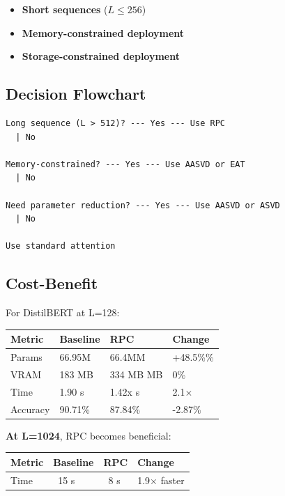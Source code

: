 \begin{itemize}
\item \textbf{Short sequences} ($L \leq 256$)
\item \textbf{Memory-constrained deployment}
\item \textbf{Storage-constrained deployment}

\end{itemize}
\subsection{Decision Flowchart}

\begin{lstlisting}
Long sequence (L > 512)? --- Yes --- Use RPC
  | No
   
Memory-constrained? --- Yes --- Use AASVD or EAT
  | No
   
Need parameter reduction? --- Yes --- Use AASVD or ASVD
  | No
   
Use standard attention
\end{lstlisting}

\subsection{Cost-Benefit}

For DistilBERT at L=128:

\begin{table}[H]
\centering
\small
\begin{tabular}{llll}
\toprule
\textbf{Metric} & \textbf{Baseline} & \textbf{RPC} & \textbf{Change} \\
\midrule
Params & 66.95M & 66.4MM & +48.5\%\% \\
VRAM & 183 MB & 334 MB MB & 0\% \\
Time & 1.90 s & 1.42x s & 2.1$\times$ \\
Accuracy & 90.71\% & 87.84\% & -2.87\% \\
\bottomrule
\end{tabular}
\end{table}

\textbf{At L=1024}, RPC becomes beneficial:

\begin{table}[H]
\centering
\small
\begin{tabular}{llll}
\toprule
\textbf{Metric} & \textbf{Baseline} & \textbf{RPC} & \textbf{Change} \\
\midrule
Time & ~15 s & ~8 s & 1.9$\times$ faster \\
\bottomrule
\end{tabular}
\end{table}

